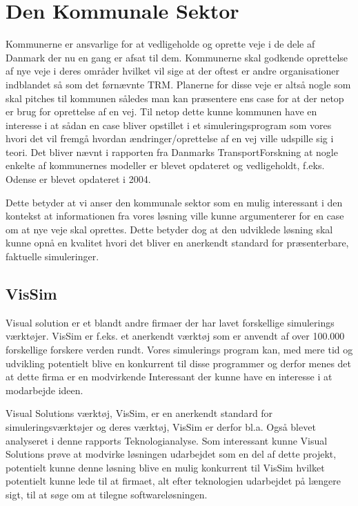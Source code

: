 \section {Den Kommunale Sektor}
Kommunerne er ansvarlige for at vedligeholde og oprette veje i de dele af Danmark der nu en gang er afsat til dem. Kommunerne skal godkende oprettelse af nye veje i deres områder hvilket vil sige at der oftest er andre organisationer indblandet så som det førnævnte TRM. Planerne for disse veje er altså nogle som skal pitches til kommunen således man kan præsentere ens case for at der netop er brug for oprettelse af en vej. Til netop dette kunne kommunen have en interesse i at sådan en case bliver opstillet i et simuleringsprogram som vores hvori det vil fremgå hvordan ændringer/oprettelse af en vej ville udspille sig i teori. Det bliver nævnt i rapporten fra Danmarks TransportForskning at nogle enkelte af kommunernes modeller er blevet opdateret og vedligeholdt, f.eks. Odense er blevet opdateret i 2004. \cite{dtfnotat}

\vspace{5mm}

Dette betyder at vi anser den kommunale sektor som en mulig interessant i den kontekst at informationen fra vores løsning ville kunne argumenterer for en case om at nye veje skal oprettes. Dette betyder dog at den udviklede løsning skal kunne opnå en kvalitet hvori det bliver en anerkendt standard for præsenterbare, faktuelle simuleringer.

\subsection{VisSim}
Visual solution er et blandt andre firmaer der har lavet forskellige simulerings værktøjer. VisSim er f.eks. et anerkendt værktøj som er anvendt af over 100.000 forskellige forskere verden rundt\cite{VisualSolutions}.
Vores simulerings program kan, med mere tid og udvikling potentielt blive en konkurrent til disse programmer og derfor menes det at dette firma er en modvirkende Interessant der kunne have en interesse i at modarbejde ideen.

\vspace{5mm}

Visual Solutions værktøj, VisSim, er en anerkendt standard for simuleringsværktøjer og deres værktøj, VisSim er derfor bl.a. Også blevet analyseret i denne rapports Teknologianalyse. Som interessant kunne Visual Solutions prøve at modvirke løsningen udarbejdet som en del af dette projekt, potentielt kunne denne løsning blive en mulig konkurrent til VisSim hvilket potentielt kunne lede til at firmaet, alt efter teknologien udarbejdet på længere sigt, til at søge om at tilegne softwareløsningen.


